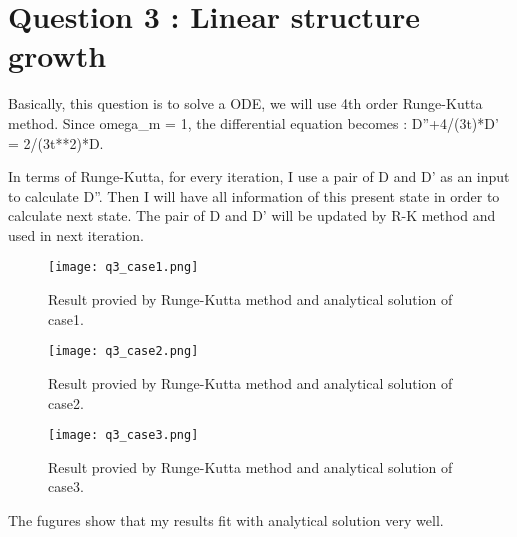 \section{Question 3 : Linear structure growth}
Basically, this question is to solve a ODE, we will use 4th order Runge-Kutta method.
Since omega_m = 1, the differential equation becomes :
D''+4/(3t)*D' = 2/(3t**2)*D.

In terms of Runge-Kutta, for every iteration, I use a pair of D and D' as an input to calculate D''. Then I will have all information of this present state in order to calculate next state. The pair of D and D' will be updated by R-K method and used
in next iteration.



\begin{figure}[h!]
  \centering
  \texttt{[image: q3\_case1.png]}
  \caption{Result provied by Runge-Kutta method and analytical solution of case1.}
  \label{fig:q3_case1}
\end{figure}

\begin{figure}[h!]
  \centering
  \texttt{[image: q3\_case2.png]}
  \caption{Result provied by Runge-Kutta method and analytical solution of case2.}
  \label{fig:q3_case1}
\end{figure}

\begin{figure}[h!]
  \centering
  \texttt{[image: q3\_case3.png]}
  \caption{Result provied by Runge-Kutta method and analytical solution of case3.}
  \label{fig:q3_case1}
\end{figure}

The fugures show that my results fit with analytical solution very well.